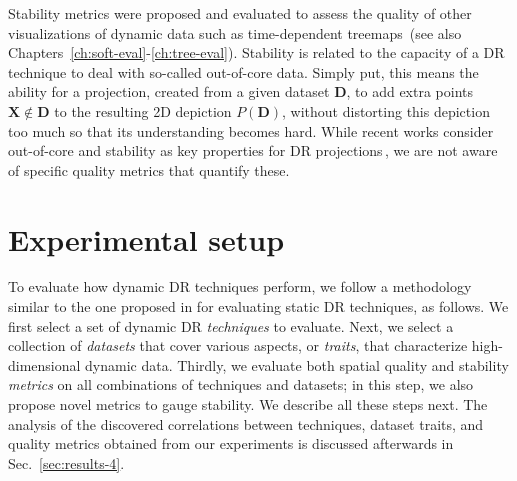 Stability metrics were proposed and evaluated to assess the quality of other visualizations of dynamic data such as time-dependent treemaps\,\citep{sondag17,vernier18git,vernier18software} (see also Chapters~\ref{ch:soft-eval}-\ref{ch:tree-eval}).
Stability is related to the capacity of a DR technique to deal with so-called out-of-core data. Simply put, this means the ability for a projection, created from a given dataset $\mathbf{D}$, to add extra points $\mathbf{X} \notin \mathbf{D}$ to the resulting 2D depiction $P(\mathbf{D})$, without distorting this depiction too much so that its understanding becomes hard. While recent works consider out-of-core and stability as key properties for DR projections\,\citep{Nonato2019,Boytsov2017,MateusEspadoto,Garcia-fernandez2013,Buja2008}, we are not aware of specific quality metrics that quantify these.


\section{Experimental setup}
\label{sec:experiment}
%
To evaluate how dynamic DR techniques perform, we follow a methodology similar to the one proposed in \cite{Espadoto19} for evaluating static DR techniques, as follows.
We first select a set of dynamic DR \emph{techniques} to evaluate. Next, we select a collection of \emph{datasets} that cover various aspects, or \emph{traits}, that characterize high-dimensional dynamic data. Thirdly, we evaluate both spatial quality and stability \emph{metrics} on all combinations of techniques and datasets; in this step, we also propose novel metrics to gauge stability. We describe all these steps next. The analysis of the discovered correlations between techniques, dataset traits, and quality metrics obtained from our experiments is discussed afterwards in Sec.~\ref{sec:results-4}.

